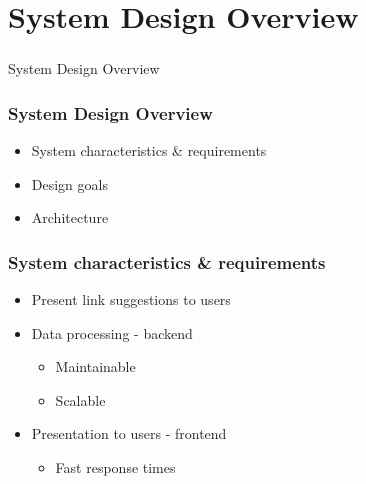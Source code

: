 \section[System Design Overview]{System Design Overview}

\begin{frame}
  \frametitle{}
  \begin{center}
    {\Huge System Design Overview}
  \end{center}
\end{frame}

\begin{frame}
    \frametitle{System Design Overview}
    \centering
    \begin{itemize}
      \item System characteristics \& requirements
      \item Design goals
      \item Architecture
    \end{itemize}
\end{frame}

\begin{frame}
    \frametitle{System characteristics \& requirements}
    \centering
    \begin{itemize}
      \item Present link suggestions to users
      \item Data processing - backend
      \begin{itemize}
        \item Maintainable
        \item Scalable
      \end{itemize}
      \item Presentation to users - frontend
      \begin{itemize}
        \item Fast response times
      \end{itemize}
    \end{itemize}
\end{frame}

